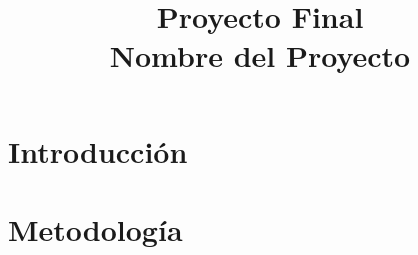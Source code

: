 \documentclass[article, 11pt]{IEEEtran}   %
\begin{document}
\title{Proyecto Final\\ Nombre del Proyecto}


\author{
}


\maketitle




\begin{abstract}
\lipsum[1-1]
\end{abstract}



\section{Introducci\'on}
\lipsum[1-3]


\section{Metodolog\'ia}
\lipsum[1-2]

\end{document}
